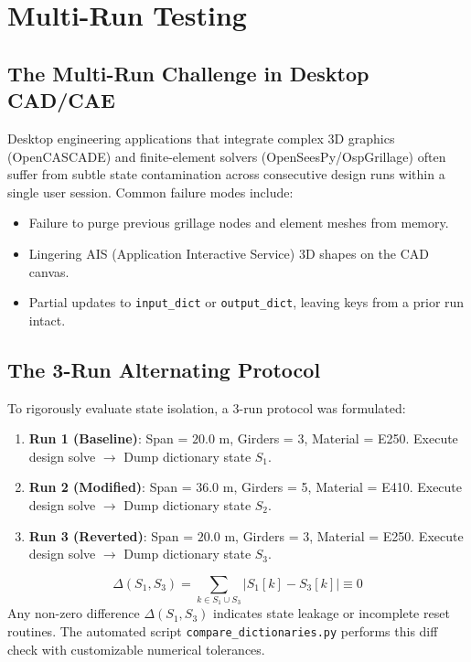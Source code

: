 \chapter{Multi-Run Testing}
\label{chap:multi_run_testing}

\section{The Multi-Run Challenge in Desktop CAD/CAE}
Desktop engineering applications that integrate complex 3D graphics (OpenCASCADE) and finite-element solvers (OpenSeesPy/OspGrillage) often suffer from subtle state contamination across consecutive design runs within a single user session. Common failure modes include:
\begin{itemize}
    \item Failure to purge previous grillage nodes and element meshes from memory.
    \item Lingering AIS (Application Interactive Service) 3D shapes on the CAD canvas.
    \item Partial updates to \texttt{input\_dict} or \texttt{output\_dict}, leaving keys from a prior run intact.
\end{itemize}

\section{The 3-Run Alternating Protocol}
To rigorously evaluate state isolation, a 3-run protocol was formulated:
\begin{enumerate}
    \item \textbf{Run 1 (Baseline)}: Span = $20.0\text{ m}$, Girders = 3, Material = E250. Execute design solve $\rightarrow$ Dump dictionary state $S_1$.
    \item \textbf{Run 2 (Modified)}: Span = $36.0\text{ m}$, Girders = 5, Material = E410. Execute design solve $\rightarrow$ Dump dictionary state $S_2$.
    \item \textbf{Run 3 (Reverted)}: Span = $20.0\text{ m}$, Girders = 3, Material = E250. Execute design solve $\rightarrow$ Dump dictionary state $S_3$.
\end{enumerate}

\begin{equation}
    \Delta(S_1, S_3) = \sum_{k \in S_1 \cup S_3} |S_1[k] - S_3[k]| \equiv 0
\end{equation}
Any non-zero difference $\Delta(S_1, S_3)$ indicates state leakage or incomplete reset routines. The automated script \texttt{compare\_dictionaries.py} performs this diff check with customizable numerical tolerances.
